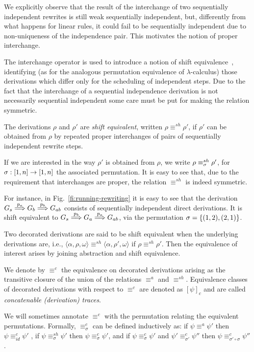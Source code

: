 We explicitly observe that the result of the interchange of two
sequentially independent rewrites is still weak sequentially
independent, but, differently from what happens for linear rules, it
could fail to be sequentially independent due to non-uniqueness of the
independence pair. This motivates the notion of proper interchange.


The interchange operator is used to introduce a notion of shift
equivalence~\cite{CMREHL:AAGT}, identifying (as for the analogous
permutation equivalence of $\lambda$-calculus) those derivations which
differ only for the scheduling of independent steps. Due to the fact
that the interchange of a sequential independence derivation is not
necessarily sequential independent some care must be put for making the
relation symmetric.

\begin{definition}
  \label{de:shift-equivalence}
  The derivations $\rho$ and $\rho'$ are \emph{shift equivalent},
  written $\rho \equiv^{sh} \rho'$, if $\rho'$ can be obtained from
  $\rho$ by repeated proper interchanges of pairs of
  sequentially independent rewrite steps.
\end{definition}
%
If we are
interested in the way $\rho'$ is obtained from $\rho$, we write
$\rho \equiv^{sh}_\sigma \rho'$, for
$\sigma : [{1},{n}] \to [{1},{n}]$ the associated permutation.
%
It is easy to see that, due to the requirement that interchanges are proper, the relation $\equiv^{sh}$ is indeed symmetric.

For instance, in Fig.~\ref{fi:running-rewriting} it is easy to see
that the derivation $G_s \stackrel{{p_a}}{\Longrightarrow} G_b \stackrel{{p_b}}{\Longrightarrow} G_{ab}$
consists of sequentially independent direct derivations. It is shift
equivalent to $G_s \stackrel{{p_b}}{\Longrightarrow} G_a \stackrel{{p_a}}{\Longrightarrow} G_{ab}$,
via the permutation $\sigma = \{(1,2),(2,1)\}$.

Two decorated derivations are said to be shift equivalent when the
underlying derivations are, i.e.,
$\langle \alpha, \rho, \omega \rangle \equiv^{sh} \langle \alpha,
\rho', \omega \rangle$ if $\rho \equiv^{sh} \rho'$. Then the
equivalence of interest arises by joining abstraction and shift equivalence.

\begin{definition}
  We denote by $\equiv^c$ the equivalence on decorated derivations
  arising as the transitive closure of the union of the relations
  $\equiv^{a}$ and $\equiv^{sh}$.
%
  Equivalence classes of decorated derivations with respect to
  $\equiv^c$ are denoted as $[\psi]_c$ and are called
  \emph{concatenable (derivation) traces}.
\end{definition}
%
We will sometimes annotate $\equiv^c$ with the permutation relating
the equivalent permutations. Formally, $\equiv^c_\sigma$ can be
defined inductively as: if $\psi \equiv^{a} \psi'$ then
$\psi \equiv^c_{id} \psi'$ , if $\psi \equiv^{sh}_{\sigma} \psi'$ then
$\psi \equiv^c_{\sigma} \psi'$, and if
$\psi \equiv^{c}_{\sigma} \psi'$ and
$\psi' \equiv^{c}_{\sigma'} \psi''$ then
$\psi \equiv^{c}_{\sigma' \circ \sigma} \psi''$.

